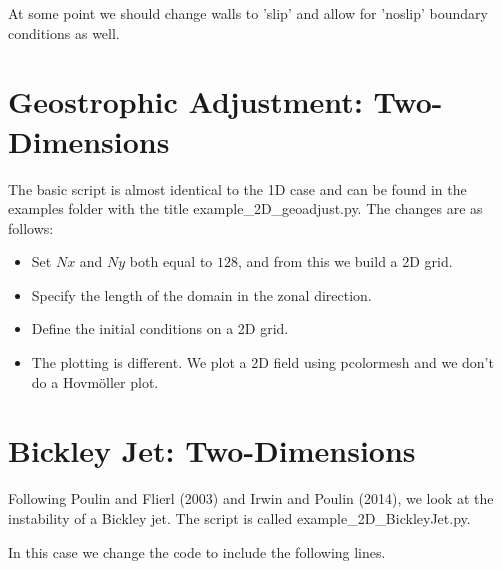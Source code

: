\documentclass[letterpaper,10pt,english]{sphinxmanual}
\begin{document}
At some point we should change walls to ’slip’ and allow for ’noslip’
boundary conditions as well.


\section{Geostrophic Adjustment: Two-Dimensions}
\label{examples:geostrophic-adjustment-two-dimensions}
The basic script is almost identical to the 1D case and can be found in
the examples folder with the title example\_2D\_geoadjust.py. The
changes are as follows:
\begin{itemize}
\item {} 
Set \(Nx\) and \(Ny\) both equal to \(128\), and from
this we build a 2D grid.

\item {} 
Specify the length of the domain in the zonal direction.

\item {} 
Define the initial conditions on a 2D grid.

\item {} 
The plotting is different. We plot a 2D field using pcolormesh and we
don’t do a Hovmöller plot.

\end{itemize}


\section{Bickley Jet: Two-Dimensions}
\label{examples:bickley-jet-two-dimensions}
Following Poulin and Flierl (2003) and Irwin and Poulin (2014), we look
at the instability of a Bickley jet. The script is called
example\_2D\_BickleyJet.py.

In this case we change the code to include the following lines.
\end{document}

